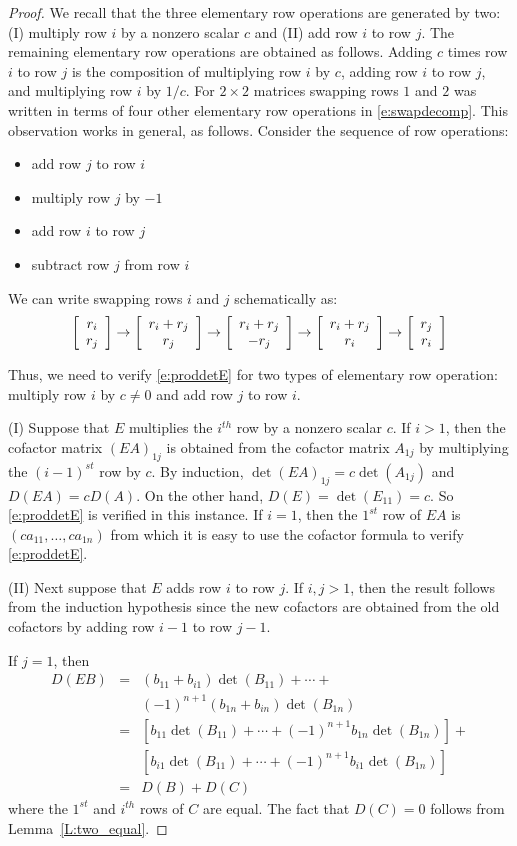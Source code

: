 \documentclass{ximera}
\begin{document}
\begin{proof}  
We recall that the three elementary row operations are 
generated by two: (I) multiply row $i$ by a nonzero scalar $c$ and (II) 
add row $i$ to row $j$.  The remaining elementary row operations are 
obtained as follows. Adding $c$ times row $i$ to row $j$ is the composition 
of multiplying row $i$ by $c$, adding row $i$ to row $j$, and multiplying row 
$i$ by $1/c$.  For $2\times 2$ matrices swapping rows $1$ and $2$ was 
written in terms of four other elementary row operations in \eqref{e:swapdecomp}.   
This observation works in general, as follows.  Consider the sequence 
of row operations:
\begin{itemize}
\item	add row $j$ to row $i$
\item multiply row $j$ by $-1$
\item add row $i$ to row $j$
\item subtract row $j$ from row $i$
\end{itemize}
We can write swapping rows $i$ and $j$ schematically as:
\[
\left[\begin{array} {ccccccccccccccccc} r_i \\ r_j \end{array}\right] \to \left[\begin{array} {ccccccccccccccccc} r_i + r_j \\ r_j \end{array}\right] \to  \left[\begin{array} {ccccccccccccccccc} r_i + r_j \\ -r_j \end{array}\right]
\to   \left[\begin{array} {ccccccccccccccccc} r_i + r_j \\ r_i \end{array}\right] \to  \left[\begin{array} {ccccccccccccccccc} r_j \\ r_i \end{array}\right]
\]

Thus, we need to verify \eqref{e:proddetE} for two types of
elementary row operation: multiply row $i$ by $c\neq 0$ and add 
row $j$ to row $i$. 

\noindent (I) Suppose that $E$ multiplies the $i^{th}$ row by a
nonzero scalar $c$.  If $i>1$, then the cofactor matrix
$(EA)_{1j}$ is obtained from the cofactor matrix $A_{1j}$ by
multiplying the $(i-1)^{st}$ row by $c$.  By induction,
$\det(EA)_{1j}= c\det(A_{1j})$ and $D(EA)=cD(A)$.  On the other
hand, $D(E)=\det(E_{11})=c$.  So \eqref{e:proddetE} is verified in
this instance.  If $i=1$, then the $1^{st}$ row of $EA$ is
$(ca_{11},\ldots,ca_{1n})$ from which it is easy to use the cofactor 
formula to verify \eqref{e:proddetE}.

\noindent (II) Next suppose that $E$ adds row $i$ to row $j$.  If  
$i,j > 1$, then the result follows from the induction hypothesis 
since the new cofactors are obtained from the old cofactors by 
adding row $i-1$ to row $j-1$. 

If $j=1$, then 
\begin{eqnarray*}
  D(EB) & = & (b_{11} + b_{i1})\det(B_{11}) +\cdots+ \\
   & & (-1)^{n+1}(b_{1n}+ b_{in})\det(B_{1n})\\
& = &
\left[b_{11}\det(B_{11})+\cdots+(-1)^{n+1}b_{1n}\det(B_{1n})\right]
+ 
\\ & & 
        \left[b_{i1}\det(B_{11})+\cdots+(-1)^{n+1}b_{i1}\det(B_{1n})\right]\\
& = & D(B) + D(C)
\end{eqnarray*}
where the $1^{st}$ and $i^{th}$ rows of $C$ are equal.  The fact that $D(C)=0$ 
follows from Lemma~\ref{L:two_equal}.


\end{proof}
\end{document}
